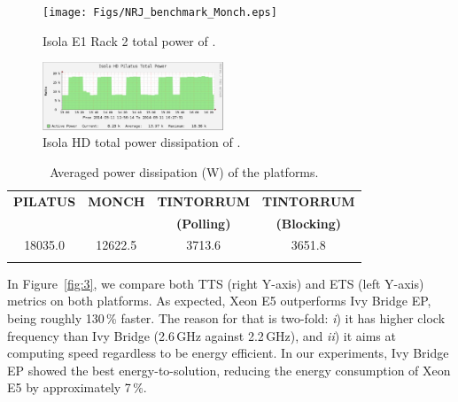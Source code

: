 \begin{figure}[htbf]
  \centering
  \texttt{[image: Figs/NRJ\_benchmark\_Monch.eps]}
  \caption{Isola E1 Rack 2 total power of \monch.}
  \label{fig:1}
\end{figure}

\begin{figure}[htbf]
  \centering
  \includegraphics[width=0.48\textwidth]{Figs/NRJ_benchmark_Pilatus.eps}
  \caption{Isola HD total power dissipation of \pilat.}
  \label{fig:2}
\end{figure}

\begin{table}[htbf]
  \centering
  \caption{Averaged power dissipation (W) of the platforms.}
  \label{tab:1}
  \begin{tabular}{cccc}
    \hline\noalign{\smallskip}     \textbf{\scriptsize{PILATUS}}     &
    \textbf{\scriptsize{MONCH}}  &  \textbf{\scriptsize{TINTORRUM}}  &
    \textbf{\scriptsize{TINTORRUM}}           \\          &          &
    \textbf{\scriptsize{(Polling)}} & \textbf{\scriptsize{(Blocking)}}
    \\    \noalign{\smallskip}\hline\noalign{\smallskip}   18035.0   &
    12622.5 & 3713.6 & 3651.8 \\ \noalign{\smallskip}\hline
  \end{tabular}
\end{table}

In  Figure~\ref{fig:3}, we  compare both  TTS (right  Y-axis)  and ETS
(left  Y-axis)  metrics  on  both  platforms.  As  expected,  Xeon  E5
outperforms Ivy  Bridge EP, being roughly 130\,\%  faster.  The reason
for that is two-fold: \emph{i}) it has higher clock frequency than Ivy
Bridge  (2.6\,GHz  against  2.2\,GHz),   and  \emph{ii})  it  aims  at
computing   speed  regardless   to  be   energy  efficient.    In  our
experiments,  Ivy  Bridge   EP  showed  the  best  energy-to-solution,
reducing the energy consumption of Xeon E5 by approximately 7\,\%.

